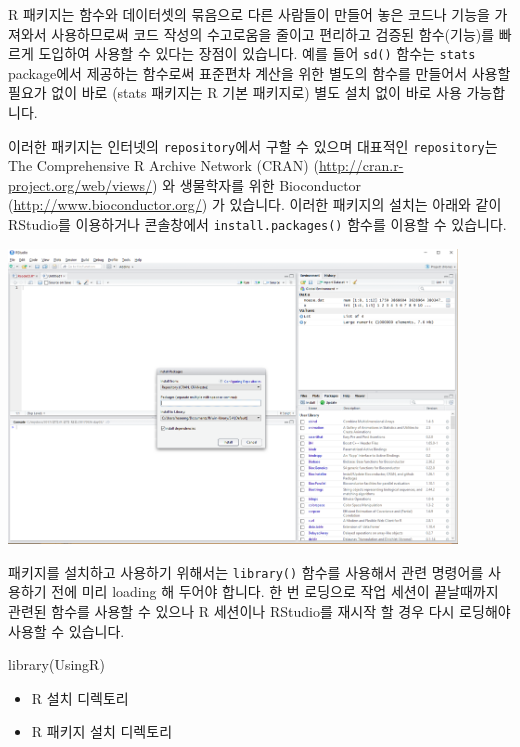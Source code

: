 \documentclass[
]{book}
\newenvironment{Shaded}{\begin{snugshade}}{\end{snugshade}}
\newcommand{\FunctionTok}[1]{\textcolor[rgb]{0.00,0.00,0.00}{#1}}
\newcommand{\NormalTok}[1]{#1}
\providecommand{\tightlist}{%
  \setlength{\itemsep}{0pt}\setlength{\parskip}{0pt}}
\begin{document}
R 패키지는 함수와 데이터셋의 묶음으로 다른 사람들이 만들어 놓은 코드나 기능을 가져와서 사용하므로써 코드 작성의 수고로움을 줄이고 편리하고 검증된 함수(기능)를 빠르게 도입하여 사용할 수 있다는 장점이 있습니다. 예를 들어 \texttt{sd()} 함수는 \texttt{stats} package에서 제공하는 함수로써 표준편차 계산을 위한 별도의 함수를 만들어서 사용할 필요가 없이 바로 (stats 패키지는 R 기본 패키지로) 별도 설치 없이 바로 사용 가능합니다.

이러한 패키지는 인터넷의 \texttt{repository}에서 구할 수 있으며 대표적인 \texttt{repository}는 The Comprehensive R Archive Network (CRAN) (\url{http://cran.r-project.org/web/views/}) 와 생물학자를 위한 Bioconductor (\url{http://www.bioconductor.org/}) 가 있습니다. 이러한 패키지의 설치는 아래와 같이 RStudio를 이용하거나 콘솔창에서 \texttt{install.packages()} 함수를 이용할 수 있습니다.

\includegraphics[width=4.6875in,height=\textheight]{images/01/01-18.PNG}

패키지를 설치하고 사용하기 위해서는 \texttt{library()} 함수를 사용해서 관련 명령어를 사용하기 전에 미리 loading 해 두어야 합니다. 한 번 로딩으로 작업 세션이 끝날때까지 관련된 함수를 사용할 수 있으나 R 세션이나 RStudio를 재시작 할 경우 다시 로딩해야 사용할 수 있습니다.

\begin{Shaded}
\begin{Highlighting}[]
\FunctionTok{library}\NormalTok{(UsingR)}
\end{Highlighting}
\end{Shaded}

\begin{itemize}
\tightlist
\item
  R 설치 디렉토리
\item
  R 패키지 설치 디렉토리
\end{itemize}
\end{document}
